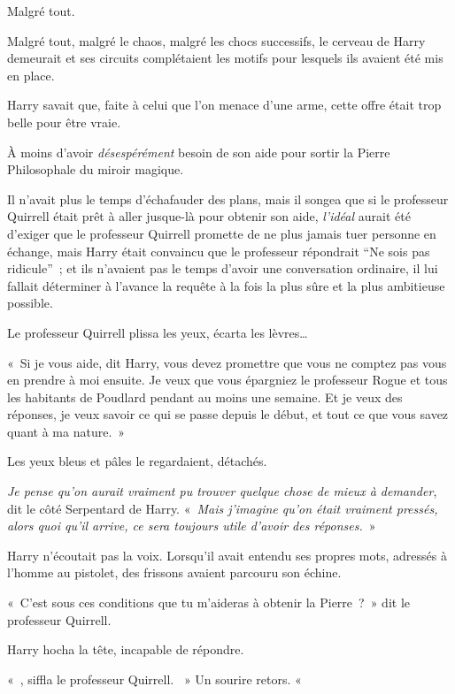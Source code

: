 \later

Malgré tout.

Malgré tout, malgré le chaos, malgré les chocs successifs, le cerveau de Harry demeurait et ses circuits complétaient les motifs pour lesquels ils avaient été mis en place.

Harry savait que, faite à celui que l'on menace d'une arme, cette offre était trop belle pour être vraie.

À moins d'avoir \emph{désespérément} besoin de son aide pour sortir la Pierre Philosophale du miroir magique.

Il n'avait plus le temps d'échafauder des plans, mais il songea que si le professeur Quirrell était prêt à aller jusque-là pour obtenir son aide, \emph{l'idéal} aurait été d'exiger que le professeur Quirrell promette de ne plus jamais tuer personne en échange, mais Harry était convaincu que le professeur répondrait “Ne sois pas ridicule”~; et ils n'avaient pas le temps d'avoir une conversation ordinaire, il lui fallait déterminer à l’avance la requête à la fois la plus sûre et la plus ambitieuse possible.

Le professeur Quirrell plissa les yeux, écarta les lèvres…

«~Si je vous aide, dit Harry, vous devez promettre que vous ne comptez pas vous en prendre à moi ensuite. Je veux que vous épargniez le professeur Rogue et tous les habitants de Poudlard pendant au moins une semaine. Et je veux des réponses, je veux savoir ce qui se passe depuis le début, et tout ce que vous savez quant à ma nature.~»

Les yeux bleus et pâles le regardaient, détachés.

\emph{Je pense qu'on aurait vraiment pu trouver quelque chose de mieux à demander}, dit le côté Serpentard de Harry. «~\emph{Mais j'imagine qu'on était vraiment pressés, alors quoi qu'il arrive, ce sera toujours utile d'avoir des réponses.}~»

Harry n'écoutait pas la voix. Lorsqu'il avait entendu ses propres mots, adressés à l'homme au pistolet, des frissons avaient parcouru son échine.

«~C'est sous ces conditions que tu m'aideras à obtenir la Pierre~?~» dit le professeur Quirrell.

Harry hocha la tête, incapable de répondre.

«~, siffla le professeur Quirrell. ~» Un sourire retors. «~

